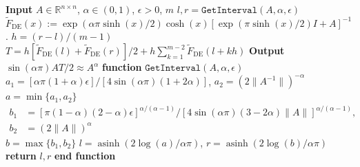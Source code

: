
\begin{algorithm}[H]\caption{}\label{alg:matrix-fractional-power-de}\begin{algorithmic}[1]
\State \textbf{Input} $A\in\mathbb{R}^{n\times n}$, $\alpha\in(0,1)$, $\epsilon>0$, $m$
\State $l,r=\mathtt{GetInterval}(A,\alpha,\epsilon)$
\State {} $\widetilde{F}_{\mathrm{DE}}(x):=\exp(\alpha\pi\sinh(x)/2)\cosh(x)[\exp(\pi\sinh(x)/2)I+A]^{-1}$.
\State $h=(r-l)/(m-1)$
\State $T=h[\widetilde{F}_{\mathrm{DE}}(l)+\widetilde{F}_{\mathrm{DE}}(r)]/2+h\sum_{k=1}^{m-2}\widetilde{F}_{\mathrm{DE}}(l+kh)$
\State \textbf{Output} $\sin(\alpha\pi)AT/2\approx A^\alpha$
\State{}
\State \textbf{function} $\mathtt{GetInterval}(A,\alpha,\epsilon)$
\State {}
\State $a_1=[\alpha\pi(1+\alpha)\epsilon]/[4\sin(\alpha\pi)(1+2\alpha)]$, $a_2=(2\|A^{-1}\|)^{-\alpha}$
\State $a=\min\{a_1,a_2\}$
\State $\begin{aligned}b_1&=[\pi(1-\alpha)(2-\alpha)\epsilon]^{\alpha/(\alpha-1)}/[4\sin(\alpha\pi)(3-2\alpha)\|A\|]^{\alpha/(\alpha-1)},\\b_2&=(2\|A\|)^\alpha\end{aligned}$
\State $b=\max\{b_1,b_2\}$
\State $l=\operatorname{asinh}(2\log(a)/\alpha\pi)$, $r=\operatorname{asinh}(2\log(b)/\alpha\pi)$
\State \textbf{return} $l,r$
\State \textbf{end function}
\end{algorithmic}\end{algorithm}

